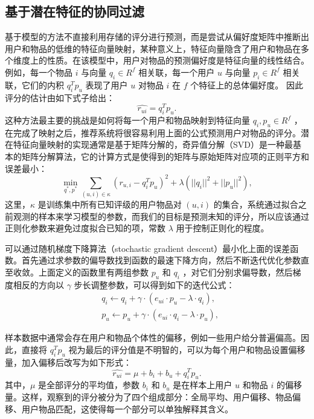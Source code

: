 \subsection{基于潜在特征的协同过滤}
基于模型的方法不直接利用存储的评分进行预测，而是尝试从偏好度矩阵中推断出用户和物品的低维的特征向量映射，某种意义上，特征向量隐含了用户和物品在多个维度上的性质。在该模型中，用户对物品的预测偏好度是特征向量的线性结合。例如，每一个物品 $i$ 与向量 $q_i \in R^f$ 相关联，每一个用户 $u$ 与向量 $p_i \in R^f$ 相关联，它们的内积 $q_i^Tp_u$ 表现了用户 $u$ 对物品 $i$ 在 $f$ 个特征上的总体偏好度。 因此评分的估计由如下式子给出：
\begin{equation}
\hat{r_{ui}} = q_i^Tp_u.
\end{equation}
这种方法最主要的挑战是如何将每一个用户和物品映射到特征向量 $q_i, p_u \in R^f$ ，在完成了映射之后，推荐系统将很容易利用上面的公式预测用户对物品的评分。潜在特征向量映射的实现通常是基于矩阵分解的，奇异值分解（SVD）\cite{paterek2007improving}是一种最基本的矩阵分解算法，它的计算方式是使得到的矩阵与原始矩阵对应项的正则平方和误差最小：
\begin{equation}
\min_{q^*, p^*} {\sum\limits_{(u,i) \in \kappa} {{(r_{u,i}-q_i^Tp_u)}^2 + \lambda(||q_i||^2 + ||p_u||^2)} } ,
\end{equation}
这里，$\kappa$ 是训练集中所有已知评级的用户物品对 $(u,i)$ 的集合，系统通过拟合之前观测的样本来学习模型的参数，而我们的目标是预测未知的评分，所以应该通过正则化参数来避免过度拟合已知的项，常数 $\lambda$ 用于控制正则化的程度。

可以通过随机梯度下降算法（stochastic gradient descent）最小化上面的误差函数。首先通过求参数的偏导数找到函数的最速下降方向，然后不断迭代优化参数直至收敛。上面定义的函数里有两组参数 $p_{u}$ 和 $q_{i}$ ，对它们分别求偏导数，然后梯度相反的方向以 $\gamma$ 步长调整参数，可以得到如下的迭代公式：
\begin{equation}
\begin{aligned}
&q_i \leftarrow q_i + 𝛾 \cdot(e_{ui} \cdot p_u -\lambda \cdot q_i),\\
&p_u \leftarrow p_u + 𝛾 \cdot(e_{ui} \cdot q_i- \lambda \cdot p_u),
\end{aligned}
\end{equation}

样本数据中通常会存在用户和物品个体性的偏移，例如一些用户给分普遍偏高。因此，直接将 $q_i^Tp_u$ 视为最后的评分值是不明智的，可以为每个用户和物品设置偏移量，加入偏移后改写为如下形式：
\begin{equation}
\hat{r_{ui}} = \mu + b_i + b_u + q_i^Tp_u.
\end{equation}
其中，$\mu$ 是全部评分的平均值，参数 $b_i$ 和 $b_u$ 是在样本上用户 $u$ 和物品 $i$ 的偏移量。这样，观察到的评分被分为了四个组成部分：全局平均、用户偏移、物品偏移、用户物品匹配，这使得每一个部分可以单独解释其含义。



